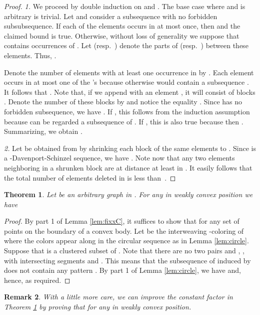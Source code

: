 \documentclass[reqno,12pt]{amsart}
\newtheorem{theorem}{Theorem}[section]
\newtheorem{remark}[theorem]{Remark}
\newcounter{claim}
\begin{document}
\begin{proof}
{\sl 1.}
We proceed by double induction on  and .
The base case where  and  is arbitrary is trivial.
Let  and consider a subsequence  with no forbidden subsubsequence. 
If each of the  elements occurs in  at most once, then
 and the claimed bound is true. Otherwise, without loss of generality 
we suppose that  contains  occurrences of . 
Let  (resp.\ ) 
denote the parts of  (resp.\ ) between these  elements.
Thus, . 

Denote the number of elements with at least one occurrence in  by .
Each element  occurs in at most one of the 's because otherwise
 would contain a subsequence . It follows that .
Note that, if we append  with an element ,
it will consist of blocks . Denote the number of these blocks
by  and notice the equality .
Since  has no forbidden subsequence, we have .
If , this follows from the induction assumption because
 can be regarded a subsequence of .
If , this is also true because then .
Summarizing, we obtain .

{\sl 2.}
Let  be obtained from  by shrinking each block 
of the same elements to . Since  is a -Davenport-Schinzel 
sequence, we have . Note now that any two elements
neighboring in a shrunken block are at distance at least  in .
It easily follows that the total number of elements deleted in  is less
than~.
\end{proof}

\begin{theorem}\label{thm:fix}
Let  be an arbitrary graph in . For any  in weakly convex position we have
 
\end{theorem}

\begin{proof}
By part 1 of Lemma \ref{lem:fixxC}, it suffices to show that 
for any set  of  points on the boundary  of a convex body.
Let  be the interweaving -coloring of  where the colors appear
along  in the circular sequence  as in Lemma \ref{lem:circle}.
Suppose that  is a clustered subset of . Note that there are no
two pairs  and , ,
with intersecting segments  and . This means that
the subsequence of  induced by  does not contain any pattern
. By part 1 of Lemma \ref{lem:circle}, we have  and, hence,
 as required.
\end{proof}

\begin{remark}\rm
With a little more care, we can improve the constant factor
in Theorem \ref{thm:fix} by proving that 
for any  in weakly convex position.
\end{remark}
\end{document}
